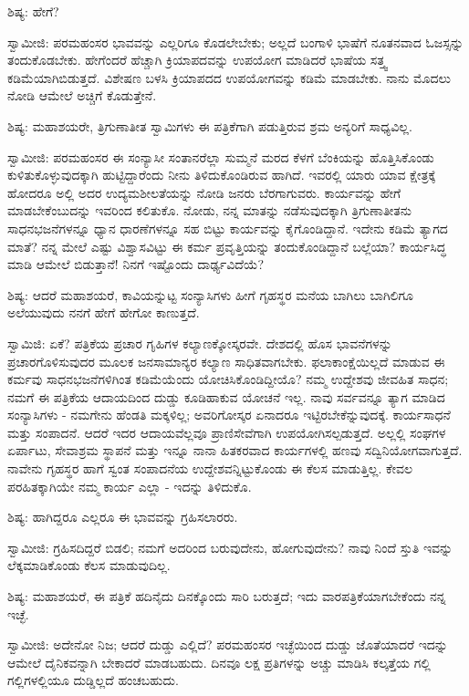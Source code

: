 ಶಿಷ್ಯ: ಹೇಗೆ?

ಸ್ವಾಮೀಜಿ: ಪರಮಹಂಸರ ಭಾವವನ್ನು ಎಲ್ಲರಿಗೂ ಕೊಡಲೇಬೇಕು; ಅಲ್ಲದೆ ಬಂಗಾಳಿ ಭಾಷೆಗೆ ನೂತನವಾದ ಓಜಸ್ಸನ್ನು ತಂದುಕೊಡಬೇಕು. ಹೇಗೆಂದರೆ ಹೆಚ್ಚಾಗಿ ಕ್ರಿಯಾಪದವನ್ನು ಉಪಯೋಗ ಮಾಡಿದರೆ ಭಾಷೆಯ ಸತ್ತ್ವ ಕಡಿಮೆಯಾಗಿಬಿಡುತ್ತದೆ. ವಿಶೇಷಣ ಬಳಸಿ ಕ್ರಿಯಾಪದದ ಉಪಯೋಗವನ್ನು ಕಡಿಮೆ ಮಾಡಬೇಕು. ನಾನು ಮೊದಲು ನೋಡಿ ಆಮೇಲೆ ಅಚ್ಚಿಗೆ ಕೊಡುತ್ತೇನೆ.

ಶಿಷ್ಯ: ಮಹಾಶಯರೇ, ತ್ರಿಗುಣಾತೀತ ಸ್ವಾಮಿಗಳು ಈ ಪತ್ರಿಕೆಗಾಗಿ ಪಡುತ್ತಿರುವ ಶ್ರಮ ಅನ್ಯರಿಗೆ ಸಾಧ್ಯವಿಲ್ಲ.

ಸ್ವಾಮೀಜಿ: ಪರಮಹಂಸರ ಈ ಸಂನ್ಯಾಸೀ ಸಂತಾನರೆಲ್ಲಾ ಸುಮ್ಮನೆ ಮರದ ಕೆಳಗೆ ಬೆಂಕಿಯನ್ನು ಹೊತ್ತಿಸಿಕೊಂಡು ಕುಳಿತುಕೊಳ್ಳುವುದಕ್ಕಾಗಿ ಹುಟ್ಟಿದ್ದಾರೆಂದು ನೀನು ತಿಳಿದುಕೊಂಡಿರುವ ಹಾಗಿದೆ. ಇವರಲ್ಲಿ ಯಾರು ಯಾವ ಕ್ಷೇತ್ರಕ್ಕೆ ಹೋದರೂ ಅಲ್ಲಿ ಅದರ ಉದ್ಯಮಶೀಲತೆಯನ್ನು ನೋಡಿ ಜನರು ಬೆರಗಾಗುವರು. ಕಾರ್ಯವನ್ನು ಹೇಗೆ ಮಾಡಬೇಕೆಂಬುದನ್ನು ಇವರಿಂದ ಕಲಿತುಕೊ. ನೋಡು, ನನ್ನ ಮಾತನ್ನು ನಡೆಸುವುದಕ್ಕಾಗಿ ತ್ರಿಗುಣಾತೀತನು ಸಾಧನಭಜನೆಗಳನ್ನೂ ಧ್ಯಾನ ಧಾರಣೆಗಳನ್ನೂ ಸಹ ಬಿಟ್ಟು ಕಾರ್ಯವನ್ನು ಕೈಗೊಂಡಿದ್ದಾನೆ. ಇದೇನು ಕಡಿಮೆ ತ್ಯಾಗದ ಮಾತೆ? ನನ್ನ ಮೇಲೆ ಎಷ್ಟು ವಿಶ್ವಾಸವಿಟ್ಟು ಈ ಕರ್ಮ ಪ್ರವೃತ್ತಿಯನ್ನು ತಂದುಕೊಂಡಿದ್ದಾನೆ ಬಲ್ಲೆಯಾ? ಕಾರ್ಯಸಿದ್ಧ ಮಾಡಿ ಆಮೇಲೆ ಬಿಡುತ್ತಾನೆ! ನಿನಗೆ ಇಷ್ಟೊಂದು ದಾರ್ಢ್ಯವಿದೆಯೆ?

ಶಿಷ್ಯ: ಆದರೆ ಮಹಾಶಯರೆ, ಕಾವಿಯನ್ನುಟ್ಟ ಸಂನ್ಯಾಸಿಗಳು ಹೀಗೆ ಗೃಹಸ್ಥರ ಮನೆಯ ಬಾಗಿಲು ಬಾಗಿಲಿಗೂ ಅಲೆಯುವುದು ನನಗೆ ಹೇಗೆ ಹೇಗೋ ಕಾಣುತ್ತದೆ.

ಸ್ವಾಮಿಜಿ: ಏಕೆ? ಪತ್ರಿಕೆಯ ಪ್ರಚಾರ ಗೃಹಿಗಳ ಕಲ್ಯಾಣಕ್ಕೋಸ್ಕರವೇ. ದೇಶದಲ್ಲಿ ಹೊಸ ಭಾವನೆಗಳನ್ನು ಪ್ರಚಾರಗೊಳಿಸುವುದರ ಮೂಲಕ ಜನಸಾಮಾನ್ಯರ ಕಲ್ಯಾಣ ಸಾಧಿತವಾಗಬೇಕು. ಫಲಾಕಾಂಕ್ಷೆಯಿಲ್ಲದೆ ಮಾಡುವ ಈ ಕರ್ಮವು ಸಾಧನಭಜನೆಗಳಿಗಿಂತ ಕಡಿಮೆಯೆಂದು ಯೋಚಿಸಿಕೊಂಡಿದ್ದೀಯೊ? ನಮ್ಮ ಉದ್ದೇಶವು ಜೀವಹಿತ ಸಾಧನ; ನಮಗೆ ಈ ಪತ್ರಿಕೆಯ ಆದಾಯದಿಂದ ದುಡ್ಡು ಕೂಡಿಹಾಕುವ ಯೋಚನೆ ಇಲ್ಲ. ನಾವು ಸರ್ವವನ್ನೂ ತ್ಯಾಗ ಮಾಡಿದ ಸಂನ್ಯಾಸಿಗಳು - ನಮಗೇನು ಹೆಂಡತಿ ಮಕ್ಕಳಿಲ್ಲ; ಅವರಿಗೋಸ್ಕರ ಏನಾದರೂ ಇಟ್ಟಿರಬೇಕೆನ್ನುವುದಕ್ಕೆ. ಕಾರ್ಯಸಾಧನೆ ಮತ್ತು ಸಂಪಾದನೆ. ಆದರೆ ಇದರ ಆದಾಯವೆಲ್ಲವೂ ಪ್ರಾಣಿಸೇವೆಗಾಗಿ ಉಪಯೋಗಿಸಲ್ಪಡುತ್ತದೆ. ಅಲ್ಲಲ್ಲಿ ಸಂಘಗಳ ಏರ್ಪಾಟು, ಸೇವಾಶ್ರಮ ಸ್ಥಾಪನೆ ಮತ್ತು ಇನ್ನೂ ನಾನಾ ಹಿತಕರವಾದ ಕಾರ್ಯಗಳಲ್ಲಿ ಹಣವು ಸದ್ವಿನಿಯೋಗವಾಗುತ್ತದೆ. ನಾವೇನು ಗೃಹಸ್ಥರ ಹಾಗೆ ಸ್ವಂತ ಸಂಪಾದನೆಯ ಉದ್ದೇಶವನ್ನಿಟ್ಟುಕೊಂಡು ಈ ಕೆಲಸ ಮಾಡುತ್ತಿಲ್ಲ. ಕೇವಲ ಪರಹಿತಕ್ಕಾಗಿಯೇ ನಮ್ಮ ಕಾರ್ಯ ಎಲ್ಲಾ - ಇದನ್ನು ತಿಳಿದುಕೊ.

ಶಿಷ್ಯ: ಹಾಗಿದ್ದರೂ ಎಲ್ಲರೂ ಈ ಭಾವವನ್ನು ಗ್ರಹಿಸಲಾರರು.

ಸ್ವಾಮೀಜಿ: ಗ್ರಹಿಸದಿದ್ದರೆ ಬಿಡಲಿ; ನಮಗೆ ಅದರಿಂದ ಬರುವುದೇನು, ಹೋಗುವುದೇನು? ನಾವು ನಿಂದೆ ಸ್ತುತಿ ಇವನ್ನು ಲೆಕ್ಕಮಾಡಿಕೊಂಡು ಕೆಲಸ ಮಾಡುವುದಿಲ್ಲ.

ಶಿಷ್ಯ: ಮಹಾಶಯರೆ, ಈ ಪತ್ರಿಕೆ ಹದಿನೈದು ದಿನಕ್ಕೊಂದು ಸಾರಿ ಬರುತ್ತದೆ; ಇದು ವಾರಪತ್ರಿಕೆಯಾಗಬೇಕೆಂದು ನನ್ನ ಇಚ್ಛೆ.

ಸ್ವಾಮೀಜಿ: ಅದೇನೋ ನಿಜ; ಆದರೆ ದುಡ್ಡು ಎಲ್ಲಿದೆ? ಪರಮಹಂಸರ ಇಚ್ಛೆಯಿಂದ ದುಡ್ಡು ಜೊತೆಯಾದರೆ ಇದನ್ನು ಆಮೇಲೆ ದೈನಿಕವನ್ನಾಗಿ ಬೇಕಾದರೆ ಮಾಡಬಹುದು. ದಿನವೂ ಲಕ್ಷ ಪ್ರತಿಗಳನ್ನು ಅಚ್ಚು ಮಾಡಿಸಿ ಕಲ್ಕತ್ತೆಯ ಗಲ್ಲಿ ಗಲ್ಲಿಗಳಲ್ಲಿಯೂ ದುಡ್ಡಿಲ್ಲದೆ ಹಂಚಬಹುದು.

